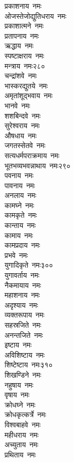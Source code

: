 \begin{multicols}{\maxColumns}
\begin{flushleft}
प्रकाशनाय~नमः\\
ओजस्तेजोद्युतिधराय~नमः\\
प्रकाशात्मने~नमः\\
प्रतापनाय~नमः\\
ऋद्धाय~नमः\\
स्पष्टाक्षराय~नमः\\
मन्त्राय~नमः\hfill २८०\\
चन्द्रांशवे~नमः\\
भास्करद्युतये~नमः\\
अमृतांशूद्भवाय~नमः\\
भानवे~नमः\\
शशबिन्दवे~नमः\\
सुरेश्वराय~नमः\\
औषधाय~नमः\\
जगतस्सेतवे~नमः\\
सत्यधर्मपराक्रमाय~नमः\\
भूतभव्यभवन्नाथाय~नमः\hfill २९०\\
पवनाय~नमः\\
पावनाय~नमः\\
अनलाय~नमः\\
कामघ्ने~नमः\\
कामकृते~नमः\\
कान्ताय~नमः\\
कामाय~नमः\\
कामप्रदाय~नमः\\
प्रभवे~नमः\\
युगादिकृते~नमः\hfill ३००\\
युगावर्ताय~नमः\\
नैकमायाय~नमः\\
महाशनाय~नमः\\
अदृश्याय~नमः\\
व्यक्तरूपाय~नमः\\
सहस्रजिते~नमः\\
अनन्तजिते~नमः\\
इष्टाय~नमः\\
अविशिष्टाय~नमः\\
शिष्टेष्टाय~नमः\hfill ३१०\\
शिखण्डिने~नमः\\
नहुषाय~नमः\\
वृषाय~नमः\\
क्रोधघ्ने~नमः\\
क्रोधकृत्कर्त्रे~नमः\\
विश्वबाहवे~नमः\\
महीधराय~नमः\\
अच्युताय~नमः\\
प्रथिताय~नमः\\

\end{flushleft}
\end{multicols}
